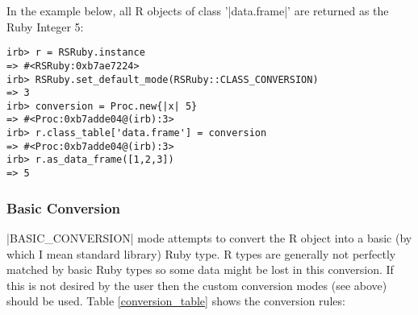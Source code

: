 \documentclass[a4paper,12pt]{book}
\begin{document}
In the example below, all R objects of class '|data.frame|' are returned as the Ruby Integer 5:

\begin{Verbatim}
irb> r = RSRuby.instance
=> #<RSRuby:0xb7ae7224>
irb> RSRuby.set_default_mode(RSRuby::CLASS_CONVERSION)
=> 3
irb> conversion = Proc.new{|x| 5}
=> #<Proc:0xb7adde04@(irb):3>
irb> r.class_table['data.frame'] = conversion
=> #<Proc:0xb7adde04@(irb):3>
irb> r.as_data_frame([1,2,3])
=> 5
\end{Verbatim}

\subsubsection{Basic Conversion}

|BASIC_CONVERSION| mode attempts to convert the R object into a basic (by which I mean standard library) Ruby type. R types are generally not perfectly matched by basic Ruby types so some data might be lost in this conversion. If this is not desired by the user then the custom conversion modes (see above) should be used. Table \ref{conversion_table} shows the conversion rules:
\end{document}
